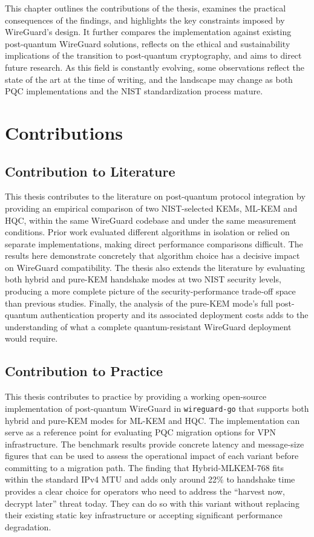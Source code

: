 
This chapter outlines the contributions of the thesis, examines the practical consequences of the findings, and highlights the key constraints imposed by WireGuard's design. It further compares the implementation against existing post-quantum WireGuard solutions, reflects on the ethical and sustainability implications of the transition to post-quantum cryptography, and aims to direct future research. As this field is constantly evolving, some observations reflect the state of the art at the time of writing, and the landscape may change as both PQC implementations and the NIST standardization process mature.

\section{Contributions} 
\subsection{Contribution to Literature} 
This thesis contributes to the literature on post-quantum protocol integration by providing an empirical comparison of two NIST-selected KEMs, ML-KEM and HQC, within the same WireGuard codebase and under the same measurement conditions. Prior work evaluated different algorithms in isolation or relied on separate implementations, making direct performance comparisons difficult. The results here demonstrate concretely that algorithm choice has a decisive impact on WireGuard compatibility. The thesis also extends the literature by evaluating both hybrid and pure-KEM handshake modes at two NIST security levels, producing a more complete picture of the security-performance trade-off space than previous studies. Finally, the analysis of the pure-KEM mode's full post-quantum authentication property and its associated deployment costs adds to the understanding of what a complete quantum-resistant WireGuard deployment would require. 

\subsection{Contribution to Practice} 
This thesis contributes to practice by providing a working open-source implementation of post-quantum WireGuard in \texttt{wireguard-go} that supports both hybrid and pure-KEM modes for ML-KEM and HQC. The implementation can serve as a reference point for evaluating PQC migration options for VPN infrastructure. The benchmark results provide concrete latency and message-size figures that can be used to assess the operational impact of each variant before committing to a migration path. The finding that Hybrid-MLKEM-768 fits within the standard IPv4 MTU and adds only around 22\% to handshake time provides a clear choice for operators who need to address the ``harvest now, decrypt later'' threat today. They can do so with this variant without replacing their existing static key infrastructure or accepting significant performance degradation. 

